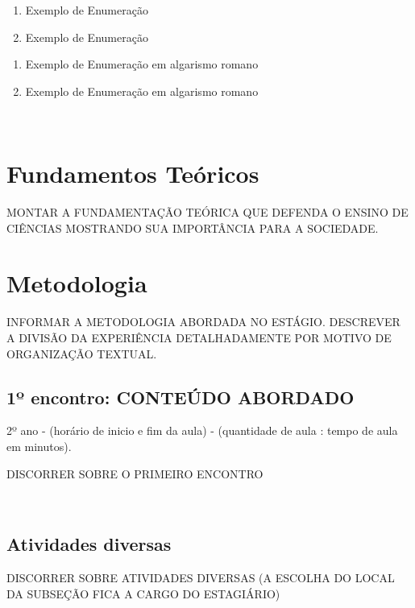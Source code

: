 \documentclass[a4paper, 12 pt]{article}                                	%
\begin{document}
	\begin{enumerate} %
		\item Exemplo de Enumeração
		\item Exemplo de Enumeração
	\end{enumerate}

	\begin{enumerate}[label=\Roman*.] %
		\item Exemplo de Enumeração em algarismo romano
		\item Exemplo de Enumeração	em algarismo romano
	\end{enumerate}
	\
	
	\section{Fundamentos Teóricos}
	
	
	MONTAR A FUNDAMENTAÇÃO TEÓRICA QUE DEFENDA O ENSINO DE CIÊNCIAS MOSTRANDO SUA IMPORTÂNCIA PARA A SOCIEDADE.
	
	
	\section{Metodologia}
	\label{sec:metodologia}
	
	INFORMAR A METODOLOGIA ABORDADA NO ESTÁGIO. DESCREVER A DIVISÃO DA EXPERIÊNCIA DETALHADAMENTE POR MOTIVO DE ORGANIZAÇÃO TEXTUAL.
	
	\subsection{1º encontro: CONTEÚDO ABORDADO} 2º ano - (horário de inicio e fim da aula) - (quantidade de aula : tempo de aula em minutos).
	
	DISCORRER SOBRE O PRIMEIRO ENCONTRO  
	
	
	\
	\subsection{Atividades diversas}
	
	DISCORRER SOBRE ATIVIDADES DIVERSAS (A ESCOLHA DO LOCAL DA SUBSEÇÃO FICA A CARGO DO ESTAGIÁRIO)
	
\end{document}
